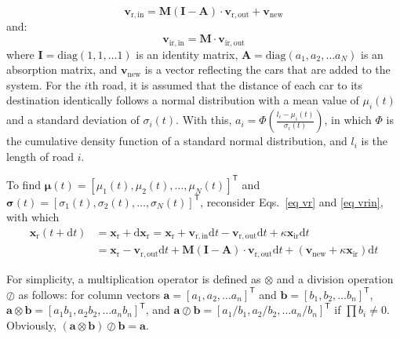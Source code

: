 \documentclass[review,11pt,nonatbib]{elsarticle}
\begin{document}
\begin{equation}\label{eq vrin}
\mathbf{v}_{\mathrm{r,in}} = \mathbf{M}(\mathbf{I}-\mathbf{A})\cdot \mathbf{v}_{\mathrm{r,out}} + \mathbf{v}_{\mathrm{new}}
\end{equation}
and:
\begin{equation}\label{eq virin}
\mathbf{v}_{\mathrm{ir,in}} = \mathbf{M}\cdot \mathbf{v}_{\mathrm{ir,out}}
\end{equation}
where $\mathbf{I}=\mathrm{diag}(1,1,\ldots 1)$ is an identity matrix, $\mathbf{A}=\mathrm{diag}(a_1,a_2,\ldots a_N)$ is an absorption matrix, and $\mathbf{v}_{\mathrm{new}}$ is a vector reflecting the cars that are added to the system. For the $i$th road, it is assumed that the distance of each car to its destination identically follows a normal distribution with a mean value of $\mu_i(t)$ and a standard deviation of $\sigma_i(t)$. With this, $a_i=\Phi\left(\frac{l_i-\mu_i(t)}{\sigma_i(t)}\right)$, in which $\Phi$ is the cumulative density function of a standard normal distribution, and $l_i$ is the length of road $i$.
\par To find ${\bm{\mu}}(t)=[\mu_1(t),\mu_2(t),\ldots,\mu_N(t)]^{\mathsf{T}}$ and ${\bm{\sigma}}(t)=[\sigma_1(t),\sigma_2(t),\ldots,\sigma_N(t)]^{\mathsf{T}}$, reconsider Eqs.~\eqref{eq vr} and \eqref{eq vrin}, with which
\begin{equation}\label{eq xr t+dt}
\begin{aligned}
\mathbf{x}_{\mathrm{r}}(t+\mathrm{d}t)
& = \mathbf{x}_{\mathrm{r}} + \mathrm{d} \mathbf{x}_{\mathrm{r}} = \mathbf{x}_{\mathrm{r}} + \mathbf{v}_{\mathrm{r,in}}\mathrm{d}t - \mathbf{v}_{\mathrm{r,out}}\mathrm{d}t + \kappa \mathbf{x}_{\mathrm{ir}}\mathrm{d}t  \\
&=  \mathbf{x}_{\mathrm{r}} - \mathbf{v}_{\mathrm{r,out}}\mathrm{d}t + \mathbf{M}(\mathbf{I}-\mathbf{A})\cdot \mathbf{v}_{\mathrm{r,out}}\mathrm{d}t + (\mathbf{v}_{\mathrm{new}} +\kappa \mathbf{x}_{\mathrm{ir}})\mathrm{d}t
\end{aligned}
\end{equation}
\par For simplicity, a multiplication operator is defined as $\otimes$ and a division operation $\oslash$ as follows: for column vectors $\mathbf{a}=[a_1,a_2,\ldots a_n]^{\mathsf{T}}$ and $\mathbf{b}=[b_1,b_2,\ldots b_n]^{\mathsf{T}}$, $\mathbf{a}\otimes\mathbf{b}=[a_1b_1,a_2b_2,\ldots a_nb_n]^{\mathsf{T}}$, and $\mathbf{a}\oslash\mathbf{b}=[a_1/b_1,a_2/b_2,\ldots a_n/b_n]^{\mathsf{T}}$ if $\prod b_i\neq 0$. Obviously, $(\mathbf{a}\otimes\mathbf{b})\oslash \mathbf{b}=\mathbf{a}$.
\end{document}
